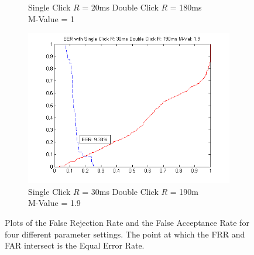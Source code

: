 \documentclass[conference]{IEEEtran}
\begin{document}
\begin{figure}[t!]
\begin{subfigure}{.5\textwidth}
  \caption{Single Click $R$ = 20ms Double Click $R$ = 180ms\\M-Value = 1}
  \label{fig:sfig3}
\end{subfigure}%
\begin{subfigure}{.5\textwidth}
  \centering
  \includegraphics[width=.8\linewidth]{19M}
  \caption{Single Click $R$ = 30ms Double Click $R$ = 190m\\ M-Value = 1.9}
  \label{fig:sfig4}
\end{subfigure}
\caption{Plots of the False Rejection Rate and the False Acceptance Rate for four different parameter settings. The point at which the FRR and FAR intersect is the Equal Error Rate. }
\label{fig:fig}
\end{figure}
\end{document}
